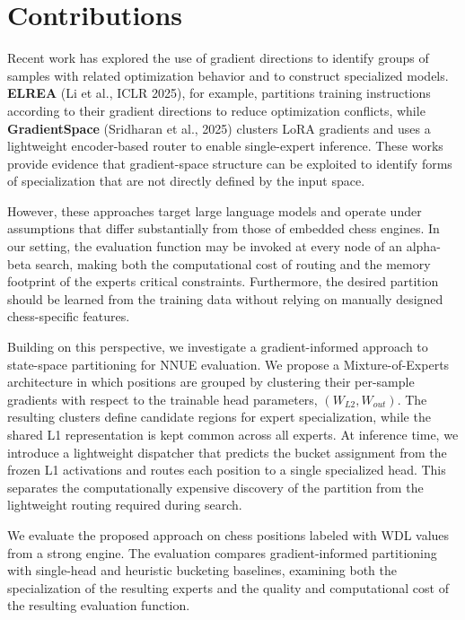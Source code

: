 \section{Contributions}

Recent work has explored the use of gradient directions to identify groups of samples with related optimization behavior and to construct specialized models. \textbf{ELREA} (Li et al., ICLR 2025), for example, partitions training instructions according to their gradient directions to reduce optimization conflicts, while \textbf{GradientSpace} (Sridharan et al., 2025) clusters LoRA gradients and uses a lightweight encoder-based router to enable single-expert inference. These works provide evidence that gradient-space structure can be exploited to identify forms of specialization that are not directly defined by the input space.

However, these approaches target large language models and operate under assumptions that differ substantially from those of embedded chess engines. In our setting, the evaluation function may be invoked at every node of an alpha-beta search, making both the computational cost of routing and the memory footprint of the experts critical constraints. Furthermore, the desired partition should be learned from the training data without relying on manually designed chess-specific features.

Building on this perspective, we investigate a gradient-informed approach to state-space partitioning for NNUE evaluation. We propose a Mixture-of-Experts architecture in which positions are grouped by clustering their per-sample gradients with respect to the trainable head parameters, $(W_{L2}, W_{out})$. The resulting clusters define candidate regions for expert specialization, while the shared L1 representation is kept common across all experts. At inference time, we introduce a lightweight dispatcher that predicts the bucket assignment from the frozen L1 activations and routes each position to a single specialized head. This separates the computationally expensive discovery of the partition from the lightweight routing required during search.

We evaluate the proposed approach on chess positions labeled with WDL values from a strong engine. The evaluation compares gradient-informed partitioning with single-head and heuristic bucketing baselines, examining both the specialization of the resulting experts and the quality and computational cost of the resulting evaluation function.

